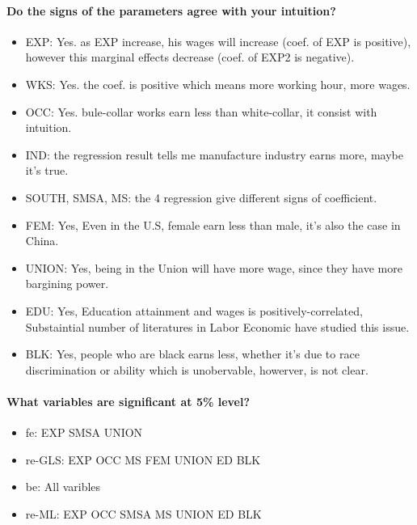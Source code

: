 \documentclass{article}
\begin{document}
\paragraph{Do the signs of the parameters agree with your intuition?\\}
\begin{itemize}
	\item EXP: Yes. as EXP increase, his wages will increase (coef. of EXP is positive), however this marginal effects decrease (coef. of EXP2 is negative).
	\item WKS: Yes. the coef. is positive which means more working hour, more wages.
	\item OCC: Yes. bule-collar works earn less than white-collar, it consist with intuition.
	\item IND: the regression result tells me manufacture industry earns more, maybe it's true.
	\item SOUTH, SMSA, MS: the 4 regression give different signs of coefficient.
	\item FEM: Yes, Even in the U.S, female earn less than male, it's also the case in China.
	\item UNION: Yes, being in the Union will have more wage, since they have more bargining power.
	\item EDU: Yes, Education attainment and wages is positively-correlated, Substaintial number of literatures in Labor Economic have studied this issue.
	\item BLK: Yes, people who are black earns less, whether it's due to race discrimination or ability which is unobervable, howerver, is not clear.
\end{itemize}
\paragraph{What variables are significant at 5\% level?\\}
\begin{itemize}
	\item fe: EXP SMSA UNION
	\item re-GLS: EXP OCC MS FEM UNION ED BLK
	\item be: All varibles
	\item re-ML: EXP OCC SMSA MS UNION ED BLK
\end{itemize}
\end{document}
